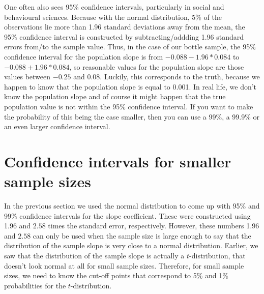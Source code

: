 \documentclass[]{book}\usepackage[]{graphicx}\usepackage[]{color}
\begin{document}
One often also sees 95\% confidence intervals, particularly in social and behavioural sciences. Because with the normal distribution, 5\% of the observations lie more than 1.96 standard deviations away from the mean, the 95\% confidence interval is constructed by subtracting/addding 1.96 standard errors from/to the sample value. Thus, in the case of our bottle sample, the 95\% confidence interval for the population slope is from $-0.088- 1.96* 0.084$ to $-0.088+ 1.96* 0.084$, so reasonable values for the population slope are those values between $-0.25$ and $0.08$. Luckily, this corresponds to the truth, because we happen to know that the population slope is equal to 0.001. In real life, we don't know the population slope and of course it might happen that the true population value is not within the 95\% confidence interval. If you want to make the probability of this being the case smaller, then you can use a 99\%, a 99.9\% or an even larger confidence interval.


\section{Confidence intervals for smaller sample sizes}

In the previous section we used the normal distribution to come up with 95\% and 99\% confidence intervals for the slope coefficient. These were constructed using 1.96 and $2.58$ times the standard error, respectively. However, these numbers 1.96 and $2.58$ can only be used when the sample size is large enough to say that the distribution of the sample slope is very close to a normal distribution. Earlier, we saw that the distribution of the sample slope is actually a $t$-distribution, that doesn't look normal at all for small sample sizes. Therefore, for small sample sizes, we need to know the cut-off points that correspond to 5\% and 1\% probabilities for the $t$-distribution.








\end{document}
